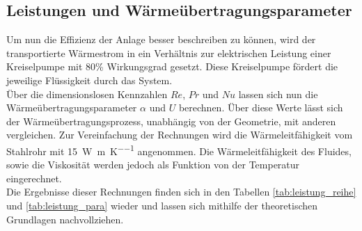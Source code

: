 \subsection{Leistungen und Wärmeübertragungsparameter}
Um nun die Effizienz der Anlage besser beschreiben zu können, wird der transportierte Wärmestrom in ein Verhältnis zur elektrischen Leistung einer Kreiselpumpe mit 80\% Wirkungsgrad gesetzt. Diese Kreiselpumpe fördert die jeweilige Flüssigkeit durch das System.\\
Über die dimensionslosen Kennzahlen $Re$, $Pr$ und $Nu$ lassen sich nun die Wärmeübertragungsparameter $\alpha $ und $U$ berechnen. Über diese Werte lässt sich der Wärmeübertragungsprozess, unabhängig von der Geometrie, mit anderen vergleichen. Zur Vereinfachung der Rechnungen wird die Wärmeleitfähigkeit vom Stahlrohr mit \SI{15}{\watt\per\meter \per\kelvin} angenommen. Die Wärmeleitfähigkeit des Fluides, sowie die Viskosität werden jedoch als Funktion von der Temperatur eingerechnet.\\
Die Ergebnisse dieser Rechnungen finden sich in den Tabellen \ref{tab:leistung_reihe} und \ref{tab:leistung_para} wieder und lassen sich mithilfe der theoretischen Grundlagen nachvollziehen.
\begin{table}[h!]
	\centering
	\caption{Berechnete Leistungen, dimensionslose Kennzahlen und \linebreak Wärmeübertragungsparameter der Reihenschaltung}
	\label{tab:leistung_reihe}
\end{table}%
